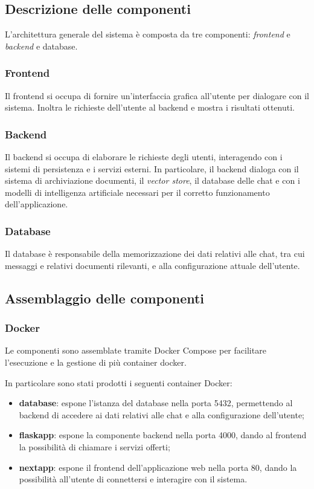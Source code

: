 \documentclass[10pt, a4paper]{article}
\begin{document}
\subsection{Descrizione delle componenti}
L'architettura generale del sistema è composta da tre componenti: \textit{frontend\pg} e \textit{backend\pg} e database.

\subsubsection{Frontend}
Il frontend si occupa di fornire un'interfaccia grafica all'utente per dialogare con il sistema.
Inoltra le richieste dell'utente al backend e mostra i risultati ottenuti.

\subsubsection{Backend}
Il backend si occupa di elaborare le richieste degli utenti, interagendo con i sistemi di persistenza e i servizi esterni.
In particolare, il backend dialoga con il sistema di archiviazione documenti, il \textit{vector store\pg}, il database delle chat e con i modelli di intelligenza artificiale necessari per il corretto funzionamento dell'applicazione.

\subsubsection{Database}
Il database è responsabile della memorizzazione dei dati relativi alle chat, tra cui messaggi e relativi documenti rilevanti,
e alla configurazione attuale dell'utente.


\subsection{Assemblaggio delle componenti}
\subsubsection{Docker}
Le componenti sono assemblate tramite Docker Compose per facilitare l'esecuzione e la gestione di più container docker.

In particolare sono stati prodotti i seguenti container Docker:
\begin{itemize}
    \item \textbf{database}: espone l'istanza del database nella porta 5432, permettendo al backend di accedere ai dati relativi alle chat e alla configurazione dell'utente;
    \item \textbf{flaskapp}: espone la componente backend nella porta 4000, dando al frontend la possibilità di chiamare i servizi offerti;
    \item \textbf{nextapp}: espone il frontend dell'applicazione web nella porta 80, dando la possibilità all'utente di connettersi e interagire con il sistema.
\end{itemize}
\end{document}
